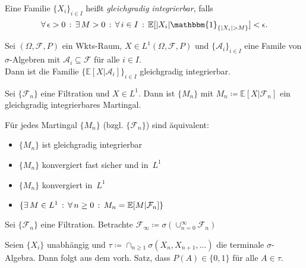 \documentclass{cheat-sheet}
\newcommand{\E}{\mathbb{E}} %
\newcommand{\ind}{\mathbbm{1}} %
\newcommand{\Alg}{\mathcal{A}} %
\newcommand{\Filt}{\mathcal{F}} %
\begin{document}

\begin{defn}
  Eine Familie $\{ X_i \}_{i \in I}$ heißt \emph{gleichgradig integrierbar}, falls
  \[
    \fa{\epsilon > 0} \ex{M > 0} \fa{i \in I} \E[ \abs{X_i} \ind_{\{ \abs{X_i} > M \}} ] < \epsilon.
  \]
\end{defn}

\begin{lem}
  Sei $(\Omega, \mathcal{F}, P)$ ein Wkts-Raum, $X \in L^1(\Omega, \mathcal{F}, P)$ und $\{ \Alg_i \}_{i \in I}$ eine Famile von $\sigma$-Algebren mit $\Alg_i \subseteq \mathcal{F}$ für alle $i \in I$. \\
  Dann ist die Familie $\{ \E[ X | \Alg_i ] \}_{i \in I}$ gleichgradig integrierbar.
\end{lem}

\begin{lem}
  Sei $\{ \Filt_n \}$ eine Filtration und $X \in L^1$.
  Dann ist $\{ M_n \}$ mit $M_n \coloneqq \E[ X | \Filt_n ]$ ein gleichgradig integrierbares Martingal.
\end{lem}

\begin{satz}
  Für jedes Martingal $\{ M_n \}$ (bzgl. $\{ \Filt_n \}$) sind äquivalent:
  \begin{itemize}
    \item $\{ M_n \}$ ist gleichgradig integrierbar
    \item $\{ M_n \}$ konvergiert fast sicher und in~$L^1$
    \item $\{ M_n \}$ konvergiert in~$L^1$
    \item $\{ \ex{M \in L^1} \fa{n \geq 0} M_n = \E[ M | \Filt_n ] \}$
  \end{itemize}
\end{satz}

\begin{satz}
  Sei $\{ \mathcal{F}_n \}$ eine Filtration.
  Betrachte $\mathcal{F}_\infty \coloneqq \sigma(\cup_{n=0}^\infty \mathcal{F}_n)$
\end{satz}

\begin{bsp}
  Seien $\{ X_i \}$ unabhängig und $\tau \coloneqq \cap_{n \geq 1} \sigma(X_n, X_{n+1}, \ldots)$ die terminale $\sigma$-Algebra.
  Dann folgt aus dem vorh. Satz, dass $P(A) \in \{ 0, 1 \}$ für alle $A \in \tau$.
\end{bsp}
\end{document}
